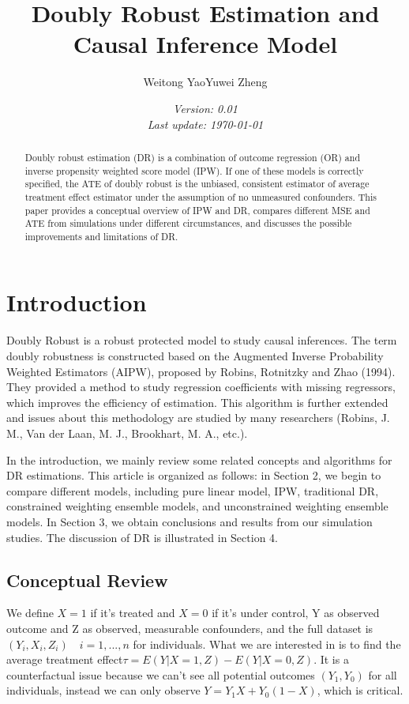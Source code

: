 \documentclass{elegantpaper}
\title{Doubly Robust Estimation and Causal Inference Model}
\author{Weitong Yao\quad Yuwei Zheng}
\date{\small\itshape Version: 0.01 \\ Last update: \today}
\begin{document}
\maketitle

\begin{abstract}
	Doubly robust estimation (DR) is a combination of outcome regression (OR) and inverse propensity weighted score model (IPW). If one of these models is correctly specified, the ATE of doubly robust is the unbiased, consistent estimator of average treatment effect estimator under the assumption of no unmeasured confounders. This paper provides a conceptual overview of IPW and DR, compares different MSE and ATE from simulations under different circumstances, and discusses the possible improvements and limitations of DR. 
\end{abstract}


\section{Introduction}

Doubly Robust is a robust protected model to study causal inferences. The term doubly robustness is constructed based on the Augmented Inverse Probability Weighted Estimators (AIPW), proposed by Robins, Rotnitzky and Zhao (1994). They provided a method to study regression coefficients with missing regressors, which improves the efficiency of estimation. This algorithm is further extended and issues about this methodology are studied by many researchers (Robins, J. M., Van der Laan, M. J., Brookhart, M. A., etc.).

In the introduction, we mainly review some related concepts and algorithms for DR estimations. This article is organized as follows: in Section 2, we begin to compare different models, including pure linear model, IPW, traditional DR, constrained weighting ensemble models, and unconstrained weighting ensemble models. In Section 3, we obtain conclusions and results from our simulation studies. The discussion of DR is illustrated in Section 4.

\subsection*{Conceptual Review}

We define $X = 1$ if it's treated and $X = 0$ if it's under control, Y as observed outcome and Z as observed, measurable confounders, and the full dataset is $(Y_i, X_i, Z_i)\quad i = 1,...,n $ for individuals. What we are interested in is to find the average treatment effect\quad  $\tau = E(Y|X=1,Z) - E(Y|X=0,Z)$. It is a counterfactual issue because we can't see all potential outcomes $(Y_1,Y_0)$ for all individuals, instead we can only observe $Y = Y_1X+Y_0(1-X)$, which is critical.
\end{document}
